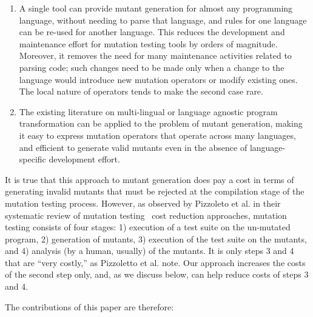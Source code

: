 \documentclass[sigconf,review, anonymous]{acmart}
\begin{document}
\begin{enumerate}
  \item A single tool can provide mutant generation for almost any
    programming language, without needing to parse that language, and
    rules for one language can be re-used for another language.  This
    reduces the development and maintenance effort for mutation
    testing tools by orders of magnitude.  Moreover, it removes the
    need for many   maintenance activities related to parsing code;
    such changes need to be made only when a change to the language
    would introduce new mutation operators or modify existing ones.
    The local nature of operators tends to make the second case rare.
    \item The existing literature on multi-lingual or language
      agnostic program transformation can be applied to the problem of
      mutant generation, making it easy to express mutation operators
      that operate across many languages, and efficient to generate
      valid mutants even in the absence of language-specific
      development effort.
      \end{enumerate}

It is true that this approach to mutant generation does pay a cost in
terms of generating invalid mutants that must be rejected at the
compilation stage of the mutation testing process.  However, as
observed by Pizzoleto et al. in their systematic review of mutation
testing~\cite{pizzoleto2019systematic} cost reduction approaches, mutation testing consists of four
stages: 1) execution of a test suite on the un-mutated program, 2)
generation of mutants, 3) execution of the test suite on the mutants,
and 4) analysis (by a human, usually) of the mutants.  It is only steps 3
and 4 that are ``very costly,'' as Pizzoletto et al. note.  Our approach increases the costs of
the second step only, and, as we discuss below, can help reduce
costs of steps 3 and 4.
      
The contributions of this paper are therefore:
\end{document}
